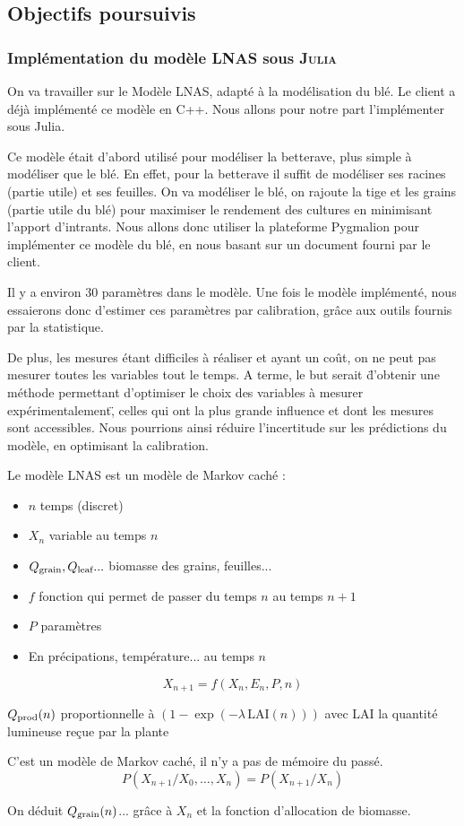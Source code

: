 \subsection{Objectifs poursuivis}
\subsubsection{Implémentation du modèle LNAS sous \textsc{Julia}}
On va travailler sur le Modèle LNAS, adapté à la modélisation du blé. 
Le client a déjà implémenté ce modèle en C++. 
Nous allons pour notre part l'implémenter sous Julia.

Ce modèle était d'abord utilisé pour modéliser la betterave, 
plus simple à modéliser que le blé. 
En effet, pour la betterave il suffit de modéliser 
ses racines (partie utile) et ses feuilles.
On va modéliser le blé, on rajoute la tige et les grains (partie utile du blé)
pour maximiser le rendement des cultures en minimisant l’apport d’intrants.
Nous allons donc utiliser la plateforme Pygmalion pour implémenter ce modèle du blé,
en nous basant sur un document fourni par le client.

Il y a environ 30 paramètres dans le modèle. Une fois le modèle implémenté, nous essaierons donc d'estimer ces paramètres par calibration, grâce aux outils fournis par la statistique.

De plus, les mesures étant difficiles à réaliser et ayant un coût, on ne peut pas mesurer toutes les variables tout le temps. A terme, le but serait \"d'obtenir une méthode permettant d'optimiser le choix des variables à mesurer expérimentalement\", celles qui ont la plus grande influence et dont les mesures sont accessibles. Nous pourrions ainsi réduire l'incertitude sur les prédictions du modèle, en optimisant la calibration.


Le modèle LNAS est un modèle de Markov caché : 
\begin{itemize}
  \item $n$  temps (discret)     
  \item $X_n$ variable au temps $n$       
  \item $Q_{\text{grain}}, Q_{\text{leaf}}... $ biomasse des grains, feuilles...      
  \item $f$ fonction qui permet de passer du temps $n$ au temps $n+1$     
  \item $P$ paramètres      
  \item En précipations, température... au temps $n$
\end{itemize}

\begin{equation}
  X_{n+1} = f(X_n,E_n,P,n)
\end{equation} 

$Q_{\text{prod}}(n)$ proportionnelle à $(1-\exp{(-\lambda \, \text{LAI}(n))})$ 
avec LAI la quantité lumineuse reçue par la plante

C’est un modèle de Markov caché, il n'y a pas de mémoire du passé.
\[
  P(X_{n+1}/X_0,…,X_n) = P(X_{n+1} / X_n) 
\] 

On déduit $Q_{\text{grain}}(n)$... grâce à $X_n$ et la fonction d'allocation de biomasse.

